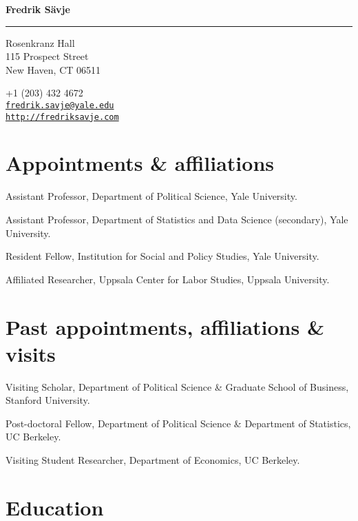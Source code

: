 \documentclass[10pt,letterpaper]{article}
\newenvironment{datelist}{
	\begin{list}{}{
		\setlength{\parskip}{0pt}
		\setlength{\itemsep}{4pt}
		\setlength{\parsep}{0.3em}
		\setlength{\leftmargin}{5.85em}
		\setlength{\labelwidth}{5.85em}
		\setlength{\labelsep}{1.5em}
		}
	}{
\end{list}
}
\newcommand{\dateitem}[2][]{\item[{#1}] {#2}}
\newenvironment{infolist}{
	\begin{list}{}{
		\setlength{\parskip}{0pt}
		\setlength{\itemsep}{4pt}
		\setlength{\parsep}{0.3em}
		\setlength{\leftmargin}{0em}
		\setlength{\labelwidth}{0em}
		}
	}{
\end{list}
}
\newcommand{\infoitem}[1]{\item {#1}}
\begin{document}
	{\huge \bf Fredrik Sävje}

	\rule{\textwidth}{1pt}

	\bigskip


	\begin{minipage}[t]{0.495\textwidth}
		Rosenkranz Hall \\
		115 Prospect Street \\
		New Haven, CT 06511
	\end{minipage}
	\begin{minipage}[t]{0.495\textwidth}
		+1 (203) 432 4672 \\
		\href{mailto:fredrik.savje@yale.edu}{\texttt{fredrik.savje@yale.edu}} \\
		\href{http://fredriksavje.com}{\texttt{http://fredriksavje.com}}
	\end{minipage}

	\vspace{0.3in}

	\section*{Appointments \& affiliations}

	\begin{infolist}
		\infoitem{Assistant Professor, Department of Political Science, Yale University.}
		\infoitem{Assistant Professor, Department of Statistics and Data Science (secondary), Yale University.}
		\infoitem{Resident Fellow, Institution for Social and Policy Studies, Yale University.}
		\infoitem{Affiliated Researcher, Uppsala Center for Labor Studies, Uppsala University.}
	\end{infolist}


	\section*{Past appointments, affiliations \& visits}

	\begin{datelist}
		\dateitem[2019--2020]{Visiting Scholar, Department of Political Science \& Graduate School of Business, Stanford University.}
		\dateitem[2015--2017]{Post-doctoral Fellow, Department of Political Science \& Department of Statistics, UC Berkeley.}
		\dateitem[2013--2014]{Visiting Student Researcher, Department of Economics, UC Berkeley.}
	\end{datelist}


	\section*{Education}
\end{document}

